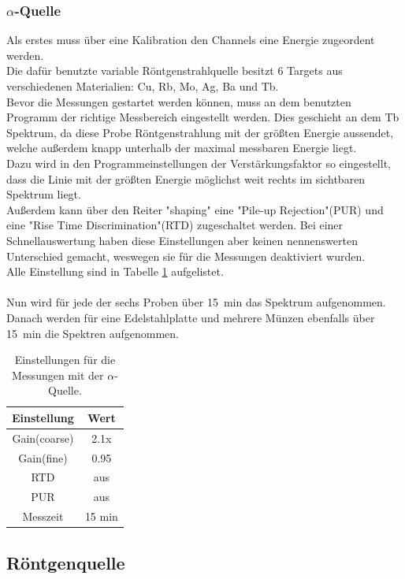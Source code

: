 \documentclass[12pt,a4paper]{article}
\begin{document}
\subsubsection{$\alpha$-Quelle}
Als erstes muss über eine Kalibration den Channels eine Energie zugeordent werden.\\
Die dafür benutzte variable Röntgenstrahlquelle besitzt 6 Targets aus verschiedenen Materialien: Cu, Rb, Mo, Ag, Ba und Tb.\\
Bevor die Messungen gestartet werden können, muss an dem benutzten Programm der richtige Messbereich eingestellt werden. Dies geschieht an dem Tb Spektrum, da diese Probe Röntgenstrahlung mit der größten Energie aussendet, welche außerdem knapp unterhalb der maximal messbaren Energie liegt.\\
Dazu wird in den Programmeinstellungen der Verstärkungsfaktor so eingestellt, dass die Linie mit der größten Energie möglichst weit rechts im sichtbaren Spektrum liegt.\\
Außerdem kann über den Reiter "shaping" eine "Pile-up Rejection"(PUR) und eine "Rise Time Discrimination"(RTD) zugeschaltet werden. Bei einer Schnellauswertung haben diese Einstellungen aber keinen nennenswerten Unterschied gemacht, weswegen sie für die Messungen deaktiviert wurden.\\
Alle Einstellung sind in Tabelle \ref{tab:alpha_Einstellungen} aufgelistet.\\
\\
Nun wird für jede der sechs Proben über \SI{15}{min} das Spektrum aufgenommen.\\
Danach werden für eine Edelstahlplatte und mehrere Münzen ebenfalls über \SI{15}{min} die Spektren aufgenommen.
\begin{table}
\centering
\begin{tabular}{|c|c|}
\hline 
Einstellung & Wert \\ 
\hline 
Gain(coarse) & 2.1x \\ 
\hline 
Gain(fine) & 0.95 \\ 
\hline 
RTD & aus \\ 
\hline 
PUR & aus \\ 
\hline 
Messzeit & 15 min \\ 
\hline 
\end{tabular} 
\caption{Einstellungen für die Messungen mit der $\alpha$-Quelle.}
\label{tab:alpha_Einstellungen}
\end{table}
\subsection{Röntgenquelle}
\end{document}
